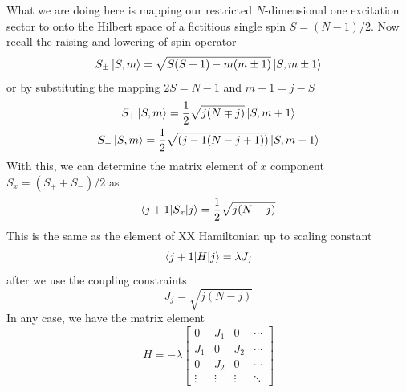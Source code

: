 \documentclass[../../../main.tex]{subfiles}
\begin{document}
What we are doing here is mapping our restricted $N$-dimensional one excitation sector to onto the Hilbert space of a fictitious single spin $S = (N-1)/2$.
Now recall the raising and lowering of spin operator
\begin{equation*}
  S_{\pm}   \ket{S, m} =  \sqrt{S(S+1) - m(m \pm 1)}   \ket{S, m \pm 1}
\end{equation*}
or by substituting the mapping $2S = N-1$ and $m +1  = j-S$
\begin{gather*}
  S_{+}   \ket{S, m} =  \frac{1 }{2 }\sqrt{j(N \mp j)}   \ket{S, m +  1}\\
  S_{-}   \ket{S, m} =  \frac{1 }{2 }\sqrt{(j-1(N-j+1))}   \ket{S, m - 1}
\end{gather*}
With this, we can determine the matrix element of $x$ component $S_x = (S_++S_-)/2$ as
\begin{equation*}
  \braket{j+1 | S_x|j} = \frac{1 }{2 }\sqrt{j(N-j)}
\end{equation*}
This is the same as the element of XX Hamiltonian up to scaling constant
\begin{equation*}
  \braket{j+1 | H|j} = \lambda J_j
\end{equation*}
after we use the coupling constraints
\begin{equation*}
  J_j = \sqrt{j(N-j)}
\end{equation*}
In any case, we have the matrix element
\begin{equation*}
  H  = -\lambda\begin{bmatrix}
    0      & J_{1}  & 0      & \cdots \\
    J_1    & 0      & J_2    & \cdots \\
    0      & J_2    & 0      & \cdots \\
    \vdots & \vdots & \vdots & \ddots
  \end{bmatrix}
\end{equation*}
\end{document}
